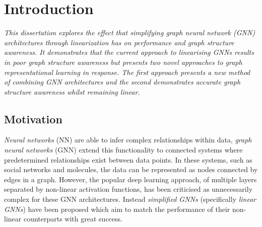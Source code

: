 \chapter{Introduction}


\emph{
    This dissertation explores the effect that simplifying graph neural network (GNN) architectures through linearization has on performance and graph structure awareness.
    It demonstrates that the current approach to linearising GNNs results in poor graph structure awareness but presents two novel approaches to graph representational learning in response.
    The first approach presents a new method of combining GNN architectures and the second demonstrates accurate graph structure awareness whilst remaining linear.
}

\section{Motivation}
\label{sec:motivation}




\emph{Neural networks} (NN) are able to infer complex relationships within data, \emph{graph neural networks} (GNN) extend this functionality to connected systems where predetermined relationships exist between data points.
In these systems, such as social networks\cite{pmlr-v70-gilmer17a} and molecules\cite{DBLP:journals/corr/abs-1806-01973}, the data can be represented as nodes connected by edges in a graph.
However, the popular deep learning approach, of multiple layers separated by non-linear activation functions, has been criticised as unnecessarily complex for these GNN architectures.\cite{wu2019simplifying}
Instead \emph{simplified GNNs} (specifically \emph{linear GNNs}) have been proposed\cite{chanpuriya2022simplified,navarin2020linear,wu2019simplifying} which aim to match the performance of their non-linear counterparts with great success.


